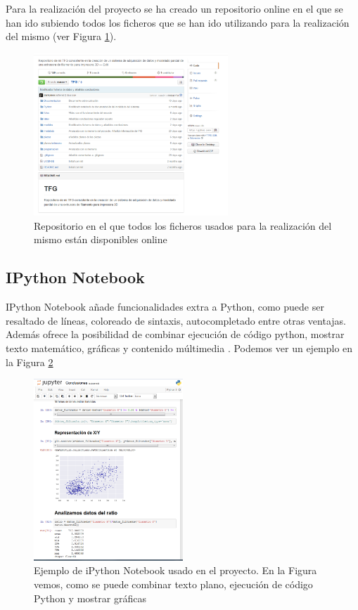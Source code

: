 Para la realización del proyecto se ha creado un repositorio online \cite{githubTFG} en el que se han ido subiendo todos los ficheros que se han ido utilizando para la realización del mismo (ver Figura \ref{fig:github}).

\begin{figure}[H]
    \centering
    \includegraphics[width=0.65\textwidth]{images/github.png}
    \caption[Repositorio online del proyecto.]{Repositorio  en el que todos los ficheros usados para la realización del mismo están disponibles online}
    \label{fig:github}
\end{figure}

\subsection{IPython Notebook}
IPython Notebook añade funcionalidades extra a Python, como puede ser resaltado de líneas, coloreado de sintaxis, autocompletado entre otras ventajas. Además ofrece la posibilidad de combinar ejecución de código python, mostrar texto matemático, gráficas y contenido múltimedia \cite{ipython}. Podemos ver un ejemplo en la Figura \ref{fig:ipython}

\begin{figure}[H]
    \centering
    \includegraphics[width=0.5\textwidth]{images/ipython.png}
    \caption[Ejemplo de iPython Notebook usado en el proyecto.]{Ejemplo de iPython Notebook usado en el proyecto. En la Figura vemos, como se puede combinar texto plano, ejecución de código Python y mostrar gráficas}
    \label{fig:ipython}
\end{figure}

